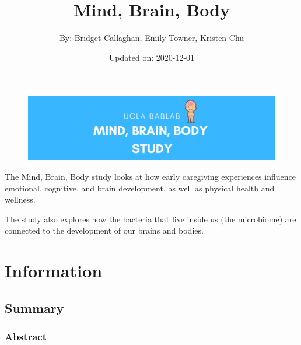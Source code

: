 \documentclass[]{book}
\title{Mind, Brain, Body}
\author{By: Bridget Callaghan, Emily Towner, Kristen Chu}
\date{Updated on: 2020-12-01}
\begin{document}
\maketitle

{
\setcounter{tocdepth}{1}
\tableofcontents
}
\hypertarget{section}{%
\chapter{}\label{section}}

\begin{figure}
\centering
\includegraphics{images/index/banner.png}
\caption{}
\end{figure}

The Mind, Brain, Body study looks at how early caregiving experiences influence emotional, cognitive, and brain development, as well as physical health and wellness.

The study also explores how the bacteria that live inside us (the microbiome) are connected to the development of our brains and bodies.

\hypertarget{information}{%
\chapter{Information}\label{information}}

\hypertarget{summary}{%
\section{Summary}\label{summary}}

\hypertarget{abstract}{%
\subsection{Abstract}\label{abstract}}
\end{document}
